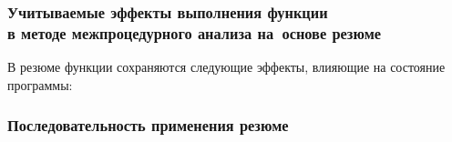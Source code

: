 \documentclass[hyperref={pdfpagelabels=false},10pt,gray]{beamer}
\begin{document}

\begin{frame}
\frametitle{Учитываемые эффекты выполнения функции\\в методе межпроцедурного анализа на~основе резюме}
В резюме функции сохраняются следующие эффекты, влияющие на состояние программы:
\begin{figure}[h]
\end{figure}
\end{frame}

\begin{frame}
\frametitle{Последовательность применения резюме}
\begin{figure}[h]
\end{figure}
\end{frame}
\end{document}
